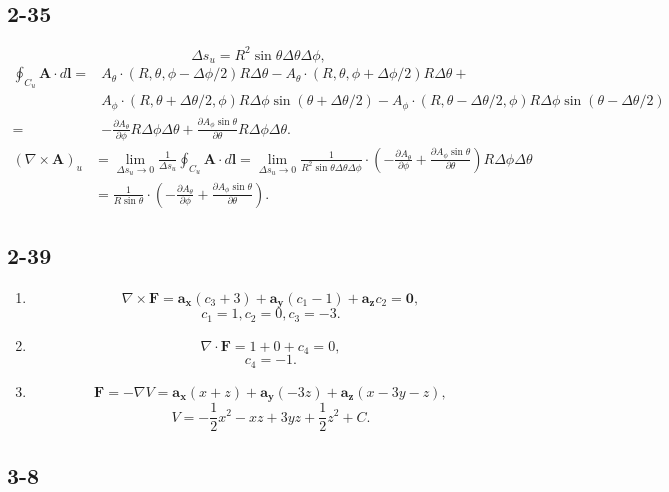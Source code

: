 \documentclass[6pt,a4paper]{article}
\begin{document}
\subsection{2-35}
$$\Delta s_u=R^2\sin\theta\Delta\theta\Delta\phi,$$
\begin{align*}
\oint_{C_u}\mathbf{A}\cdot d\mathbf{l}=&A_\theta\cdot(R,\theta,\phi-\Delta\phi/2)R\Delta\theta-A_\theta\cdot(R,\theta,\phi+\Delta\phi/2)R\Delta\theta+\\
&A_\phi\cdot(R,\theta+\Delta\theta/2,\phi)R\Delta\phi\sin(\theta+\Delta\theta/2)-A_\phi\cdot(R,\theta-\Delta\theta/2,\phi)R\Delta\phi\sin(\theta-\Delta\theta/2)\\
=&-\frac{\partial A_\theta}{\partial\phi}R\Delta\phi\Delta\theta+\frac{\partial A_\phi\sin\theta}{\partial\theta}R\Delta\phi\Delta\theta.
\end{align*}
\begin{align*}
(\nabla\times\mathbf{A})_u&=\lim_{\Delta s_u\to0}\frac{1}{\Delta s_u}\oint_{C_u}\mathbf{A}\cdot d\mathbf{l}=\lim_{\Delta s_u\to0}\frac{1}{R^2\sin\theta\Delta\theta\Delta\phi}\cdot\left(-\frac{\partial A_\theta}{\partial\phi}+\frac{\partial A_\phi\sin\theta}{\partial\theta}\right)R\Delta\phi\Delta\theta\\
&=\frac{1}{R\sin\theta}\cdot\left(-\frac{\partial A_\theta}{\partial\phi}+\frac{\partial A_\phi\sin\theta}{\partial\theta}\right).
\end{align*}
$$$$

\subsection{2-39}
\begin{enumerate}[label=\alph*)]
\item
$$\nabla\times\mathbf{F}=\mathbf{a_x}(c_3+3)+\mathbf{a_y}(c_1-1)+\mathbf{a_z}c_2=\mathbf{0},$$
$$c_1=1,c_2=0,c_3=-3.$$
\item
$$\nabla\cdot\mathbf{F}=1+0+c_4=0,$$
$$c_4=-1.$$
\item
$$\mathbf{F}=-\nabla V=\mathbf{a_x}(x+z)+\mathbf{a_y}(-3z)+\mathbf{a_z}(x-3y-z),$$
$$V=-\frac{1}{2}x^2-xz+3yz+\frac{1}{2}z^2+C.$$
\end{enumerate}


\subsection{3-8}
\begin{center}
\end{center}
\end{document}
